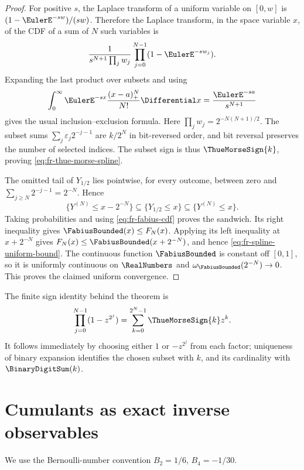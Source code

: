 \begin{proof}
For positive \(s\), the Laplace transform of a uniform variable on
\([0,w]\) is \((1-\EulerE^{-sw})/(sw)\).  Therefore the Laplace transform, in the
space variable \(x\), of the CDF of a sum of \(N\) such variables is
\[
 \frac1{s^{N+1}\prod_jw_j}\prod_{j=0}^{N-1}(1-\EulerE^{-sw_j}).
\]
Expanding the last product over subsets and using
\[
 \int_0^\infty \EulerE^{-sx}\frac{(x-a)_+^N}{N!}\Differential x
 =\frac{\EulerE^{-sa}}{s^{N+1}}
\]
gives the usual inclusion--exclusion formula.  Here
\(\prod_jw_j=2^{-N(N+1)/2}\).  The subset sums
\(\sum_j\varepsilon_j2^{-j-1}\) are \(k/2^N\) in bit-reversed order, and bit
reversal preserves the number of selected indices.  The subset sign is thus
\(\ThueMorseSign{k}\), proving \cref{eq:fr-thue-morse-spline}.

The omitted tail of \(Y_{1/2}\) lies pointwise, for every outcome, between
zero and \(\sum_{j\ge N}2^{-j-1}=2^{-N}\).  Hence
\[
 \{Y^{(N)}\le x-2^{-N}\}
 \subseteq\{Y_{1/2}\le x\}
 \subseteq\{Y^{(N)}\le x\}.
\]
Taking probabilities and using \cref{eq:fr-fabius-cdf} proves the sandwich.
Its right inequality gives \(\FabiusBounded(x)\le F_N(x)\).  Applying its left inequality
at \(x+2^{-N}\) gives \(F_N(x)\le\FabiusBounded(x+2^{-N})\), and hence
\cref{eq:fr-spline-uniform-bound}.  The continuous function \(\FabiusBounded\) is constant
off \([0,1]\), so it is uniformly continuous on \(\RealNumbers\) and
\(\omega_{\FabiusBounded}(2^{-N})\to0\).  This proves the claimed uniform convergence.
\end{proof}

The finite sign identity behind the theorem is
\begin{equation}
 \prod_{j=0}^{N-1}(1-z^{2^j})
 =\sum_{k=0}^{2^N-1}\ThueMorseSign{k}z^k.
 \label{eq:fr-thue-morse-product}
\end{equation}
It follows immediately by choosing either \(1\) or \(-z^{2^j}\) from each
factor; uniqueness of binary expansion identifies the chosen subset with
\(k\), and its cardinality with \(\BinaryDigitSum(k)\).

\section{Cumulants as exact inverse observables}
\label{sec:fr-cumulant-recovery}

We use the Bernoulli-number convention \(B_2=1/6\), \(B_4=-1/30\).

